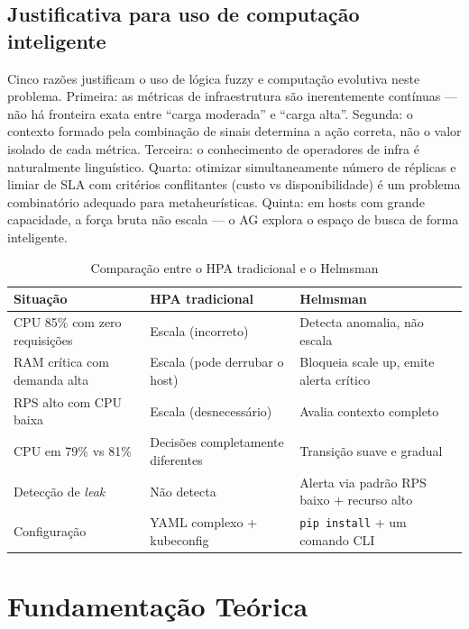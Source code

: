 \documentclass[12pt, a4paper]{article}
\begin{document}
\subsection{Justificativa para uso de computação inteligente}

Cinco razões justificam o uso de lógica fuzzy e computação evolutiva neste problema. Primeira: as métricas de infraestrutura são inerentemente contínuas — não há fronteira exata entre ``carga moderada'' e ``carga alta''. Segunda: o contexto formado pela combinação de sinais determina a ação correta, não o valor isolado de cada métrica. Terceira: o conhecimento de operadores de infra é naturalmente linguístico. Quarta: otimizar simultaneamente número de réplicas e limiar de SLA com critérios conflitantes (custo vs disponibilidade) é um problema combinatório adequado para metaheurísticas. Quinta: em hosts com grande capacidade, a força bruta não escala — o AG explora o espaço de busca de forma inteligente.

\begin{table}[H]
  \centering
  \caption{Comparação entre o HPA tradicional e o Helmsman}
  \label{tab:fuzzy_vs_hpa}
  \begin{tabularx}{\textwidth}{lXX}
    \toprule
    \rowcolor{headerblue}
    \textbf{Situação} & \textbf{HPA tradicional} & \textbf{Helmsman} \\
    \midrule
    CPU 85\% com zero requisições & Escala (incorreto) & Detecta anomalia, não escala \\
    RAM crítica com demanda alta  & Escala (pode derrubar o host) & Bloqueia scale up, emite alerta crítico \\
    RPS alto com CPU baixa        & Escala (desnecessário) & Avalia contexto completo \\
    CPU em 79\% vs 81\%           & Decisões completamente diferentes & Transição suave e gradual \\
    Detecção de \textit{leak}     & Não detecta & Alerta via padrão RPS baixo + recurso alto \\
    Configuração                  & YAML complexo + kubeconfig & \texttt{pip install} + um comando CLI \\
    \bottomrule
  \end{tabularx}
\end{table}

\section{Fundamentação Teórica}
\end{document}
